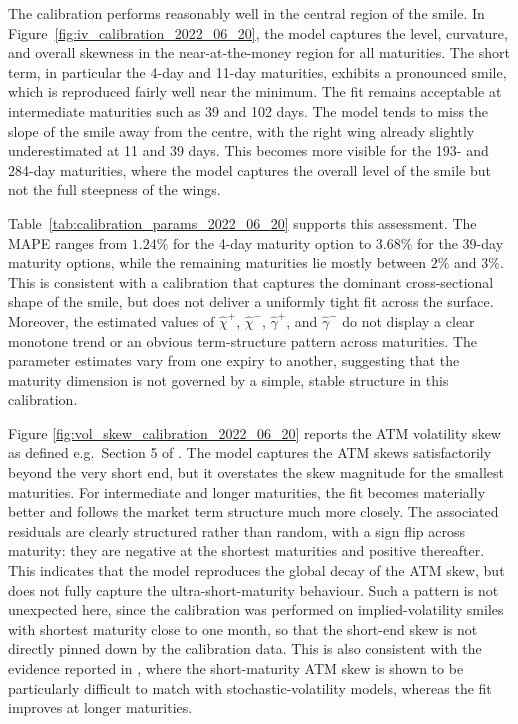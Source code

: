 \documentclass[11pt,a4paper]{article}
\numberwithin{equation}{section}
\theoremstyle{remark}
\theoremstyle{definition}
\begin{document}
The calibration performs reasonably well in the central region of the smile. In Figure~\ref{fig:iv_calibration_2022_06_20}, the model captures the level, curvature, and overall skewness in the near-at-the-money region for all maturities. The short term, in particular the 4-day and 11-day maturities, exhibits a pronounced smile, which is reproduced fairly well near the minimum. The fit remains acceptable at intermediate maturities such as 39 and 102 days.
The model tends to miss the slope of the smile away from the centre, with the right wing already slightly underestimated at 11 and 39 days. This becomes more visible for the 193- and 284-day maturities, where the model captures the overall level of the smile but not the full steepness of the wings.

Table~\ref{tab:calibration_params_2022_06_20} supports this assessment. The MAPE ranges from $1.24\%$ for the 4-day maturity option to $3.68\%$ for the 39-day maturity options, while the remaining maturities lie mostly between $2\%$ and $3\%$. This is consistent with a calibration that captures the dominant cross-sectional shape of the smile, but does not deliver a uniformly tight fit across the surface. Moreover, the estimated values of $\hat{\chi}^+$, $\hat{\chi}^-$, $\hat{\gamma}^+$, and $\hat{\gamma}^-$ do not display a clear monotone trend or an obvious term-structure pattern across maturities. The parameter estimates vary from one expiry to another, suggesting that the maturity dimension is not governed by a simple, stable structure in this calibration.

Figure \ref{fig:vol_skew_calibration_2022_06_20} reports the ATM volatility skew as defined e.g.\ Section 5 of \cite{dupret2023impact}. The model captures the ATM skews satisfactorily beyond the very short end, but it overstates the skew magnitude for the smallest maturities. For intermediate and longer maturities, the fit becomes materially better and follows the market term structure much more closely. The associated residuals are clearly structured rather than random, with a sign flip across maturity: they are negative at the shortest maturities and positive thereafter. This indicates that the model reproduces the global decay of the ATM skew, but does not fully capture the ultra-short-maturity behaviour. Such a pattern is not unexpected here, since the calibration was performed on implied-volatility smiles with shortest maturity close to one month, so that the short-end skew is not directly pinned down by the calibration data. This is also consistent with the evidence reported in \cite{dupret2023impact}, where the short-maturity ATM skew is shown to be particularly difficult to match with stochastic-volatility models, whereas the fit improves at longer maturities.
\end{document}
